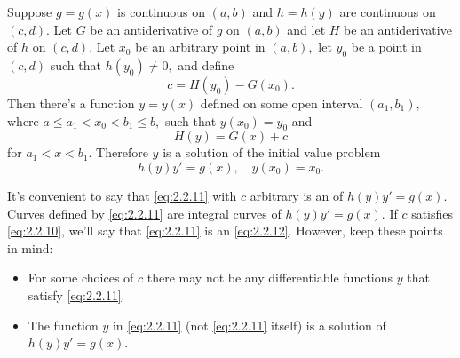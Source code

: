 \documentclass{ximera}
\begin{document}
\begin{theorem}\label{thmtype:2.2.1}
Suppose $g=g(x)$ is continuous on $(a,b)$ and $h=h(y)$
are continuous on $(c,d)$. Let $G$ be an antiderivative of
$g$ on $(a,b)$ and let $H$ be an antiderivative of $h$ on $(c,d).$
Let $x_0$ be an arbitrary point in $(a,b),$ let $y_0$
be a point in $(c,d)$ such that $h(y_0)\neq 0,$ and define
\begin{equation} \label{eq:2.2.10}
c=H(y_0)-G(x_0).
\end{equation}
Then there's a function $y=y(x)$ defined on some open interval
$(a_1,b_1),$ where $a\leq a_1<x_0<b_1\leq b,$ such that  $y(x_0)=y_0$
and
\begin{equation} \label{eq:2.2.11}
H(y)=G(x)+c
\end{equation}
for $a_1<x<b_1$.
Therefore $y$ is a solution of the initial value problem
\begin{equation} \label{eq:2.2.12}
h(y)y'=g(x),\quad y(x_0)=x_0.
\end{equation}
\end{theorem}
 
 
It's convenient to say that \eqref{eq:2.2.11} with $c$ arbitrary is an
 of $h(y)y'=g(x)$. Curves defined by
\eqref{eq:2.2.11} are integral curves of $h(y)y'=g(x)$. If $c$ satisfies
\eqref{eq:2.2.10}, we'll say that \eqref{eq:2.2.11} is an  \eqref{eq:2.2.12}. However, keep
these  points in mind:
\begin{itemize}
\item  For some choices of $c$ there may not be any differentiable
functions $y$ that satisfy \eqref{eq:2.2.11}.
\item  The function $y$ in \eqref{eq:2.2.11} (not \eqref{eq:2.2.11} itself)
is a solution of $h(y)y'=g(x)$.
\end{itemize}
 
\end{document}
